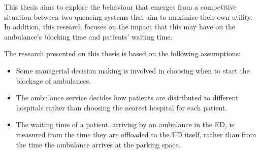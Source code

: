 This thesis aims to explore the behaviour that emerges from a competitive
situation between two queueing systems that aim to maximise their own utility.
In addition, this research focuses on the impact that this may have on the
ambulance's blocking time and patients' waiting time.

The research presented on this thesis is based on the following assumptions:
\begin{itemize}
    \item Some managerial decision making is involved in choosing when to start
    the blockage of ambulances.
    \item The ambulance service decides how patients are distributed to
    different hospitals rather than choosing the nearest hospital for each
    patient.
    \item The waiting time of a patient, arriving by an ambulance in the ED, is
    measured from the time they are offloaded to the ED itself, rather than
    from the time the ambulance arrives at the parking space.
\end{itemize}

